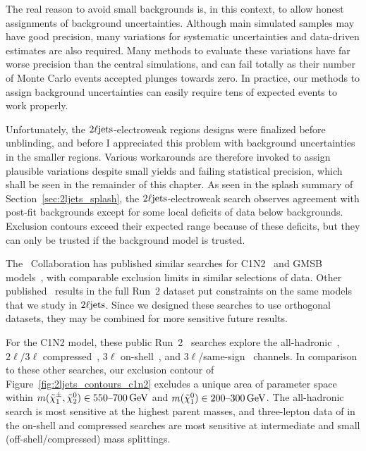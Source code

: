 The real reason to avoid small backgrounds is, in this context, to allow honest
assignments of background uncertainties.
Although main simulated samples may have good precision,
many variations for systematic uncertainties and data-driven estimates are also
required.
Many methods to evaluate these variations have far worse precision than the
central simulations, and can fail totally as their number of Monte Carlo events
accepted plunges towards zero.
In practice, our methods to assign background uncertainties can easily require
tens of expected events to work properly.

Unfortunately, the $\twoljets$-electroweak regions designs were finalized
before unblinding, and before I appreciated this problem with background
uncertainties in the smaller regions.
Various workarounds are therefore invoked to assign plausible variations
despite small yields and failing statistical precision, which shall be seen in
the remainder of this chapter.
As seen in the splash summary of Section~\ref{sec:2ljets_splash}, the
$\twoljets$-electroweak search observes agreement with post-fit backgrounds
except for some local deficits of data below backgrounds.
Exclusion contours exceed their expected range because of these deficits,
but they can only be trusted if the background model is trusted.

The \cms\ Collaboration has published similar searches for
C1N2~\cite{cms_susy_2022_c1n2} and GMSB models~\cite{
cms_susy_2018_partial_run2_combination,
cms_susy_2022_gmsb
}, with comparable exclusion limits in similar selections of data.
Other published \atlas\ results in the full Run~2 dataset put constraints on
the same models that we study in $\twoljets$.
Since we designed these searches to use orthogonal datasets, they may be
combined for more sensitive future results.

For the C1N2 model, these public Run~2 \atlas\ searches explore the
all-hadronic~\cite{SUSY-2018-41},
$2\ell/3\ell$ compressed~\cite{atlas_susy_compressed_2l_2018_run2},
$3\ell$ on-shell~\cite{SUSY-2018-06}, and
$3\ell$/same-sign~\cite{SUSY-2018-09} channels.
In comparison to these other searches, our exclusion contour of
Figure~\ref{fig:2ljets_contours_c1n2} excludes a unique area of parameter
space within $m(\chargino_1,\neutralino_2) \in 550\textrm{--}700\,\eV[G]$
and $m(\neutralino_1) \in 200\textrm{--}300\,\eV[G]$.
The all-hadronic search is most sensitive at the highest parent masses,
and three-lepton data of in the on-shell and compressed searches are most
sensitive at intermediate and small (off-shell/compressed) mass splittings.

